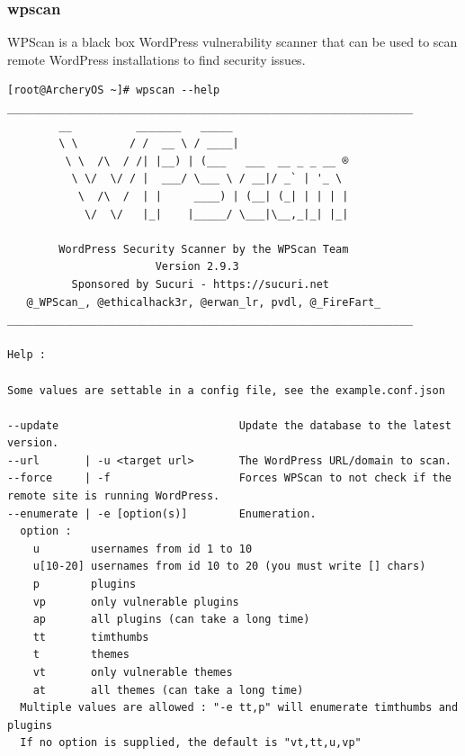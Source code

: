 \documentclass{article}
\begin{document}
\subsubsection{wpscan}
WPScan is a black box WordPress vulnerability scanner that can be used to scan remote WordPress installations to find security issues.
\begin{lstlisting}
[root@ArcheryOS ~]# wpscan --help
_______________________________________________________________
        __          _______   _____                  
        \ \        / /  __ \ / ____|                 
         \ \  /\  / /| |__) | (___   ___  __ _ _ __ ®
          \ \/  \/ / |  ___/ \___ \ / __|/ _` | '_ \ 
           \  /\  /  | |     ____) | (__| (_| | | | |
            \/  \/   |_|    |_____/ \___|\__,_|_| |_|

        WordPress Security Scanner by the WPScan Team 
                       Version 2.9.3
          Sponsored by Sucuri - https://sucuri.net
   @_WPScan_, @ethicalhack3r, @erwan_lr, pvdl, @_FireFart_
_______________________________________________________________

Help :

Some values are settable in a config file, see the example.conf.json

--update                            Update the database to the latest version.
--url       | -u <target url>       The WordPress URL/domain to scan.
--force     | -f                    Forces WPScan to not check if the remote site is running WordPress.
--enumerate | -e [option(s)]        Enumeration.
  option :
    u        usernames from id 1 to 10
    u[10-20] usernames from id 10 to 20 (you must write [] chars)
    p        plugins
    vp       only vulnerable plugins
    ap       all plugins (can take a long time)
    tt       timthumbs
    t        themes
    vt       only vulnerable themes
    at       all themes (can take a long time)
  Multiple values are allowed : "-e tt,p" will enumerate timthumbs and plugins
  If no option is supplied, the default is "vt,tt,u,vp"


\end{lstlisting}
\end{document}

